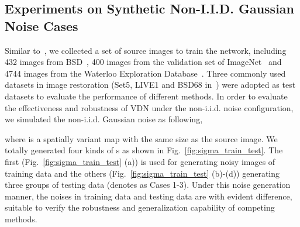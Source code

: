 \documentclass{article}
\begin{document}
\vspace{-2mm}\subsection{Experiments on Synthetic Non-I.I.D. Gaussian Noise Cases}\vspace{-2mm}
Similar to~\cite{zhang2018ffdnet}, we collected a set of source images to train the network,
including 432 images from BSD~\cite{amfm_pami2011}, 400 images from the validation set of ImageNet~\cite{DengCHI14} and
4744 images from the Waterloo Exploration Database~\cite{ma2017waterloo}. Three commonly used datasets
in image restoration (Set5, LIVE1 and BSD68 in~\cite{kim2016accurate}) were adopted as test datasets to
evaluate the performance of different methods.
In order to evaluate the effectiveness and robustness of VDN under the non-i.i.d. noise configuration,
we simulated the non-i.i.d. Gaussian noise as following,

where  is a spatially variant map with the same size as the source image.
We totally generated four kinds of s as shown in Fig.~\ref{fig:sigma_train_test}.
The first (Fig.~\ref{fig:sigma_train_test} (a)) is used for generating noisy images of training data
and the others (Fig.~\ref{fig:sigma_train_test} (b)-(d)) generating three groups of testing data (denotes as
Cases 1-3). Under this noise generation manner, the noises in training data and testing data are
with evident difference, suitable to verify the robustness and generalization capability of competing
methods.
\end{document}
